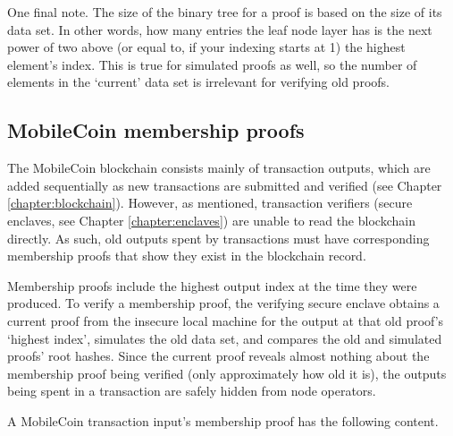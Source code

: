 One final note. The size of the binary tree for a proof is based on the size of its data set. In other words, how many entries the leaf node layer has is the next power of two above (or equal to, if your indexing starts at 1) the highest element's index. This is true for simulated proofs as well, so the number of elements in the `current' data set is irrelevant for verifying old proofs.


\subsection{MobileCoin membership proofs}
\label{subsec:mobilecoin-membership-proofs}

The MobileCoin blockchain consists mainly of transaction outputs, which are added sequentially as new transactions are submitted and verified (see Chapter \ref{chapter:blockchain}). However, as mentioned, transaction verifiers (secure enclaves, see Chapter \ref{chapter:enclaves}) are unable to read the blockchain directly. As such, old outputs spent by transactions must have corresponding membership proofs that show they exist in the blockchain record.

Membership proofs include the highest output index at the time they were produced. To verify a membership proof, the verifying secure enclave obtains a current proof from the insecure local machine for the output at that old proof's `highest index', simulates the old data set, and compares the old and simulated proofs' root hashes. Since the current proof reveals almost nothing about the membership proof being verified (only approximately how old it is), the outputs being spent in a transaction are safely hidden from node operators.

A MobileCoin transaction input's membership proof has the following content.

